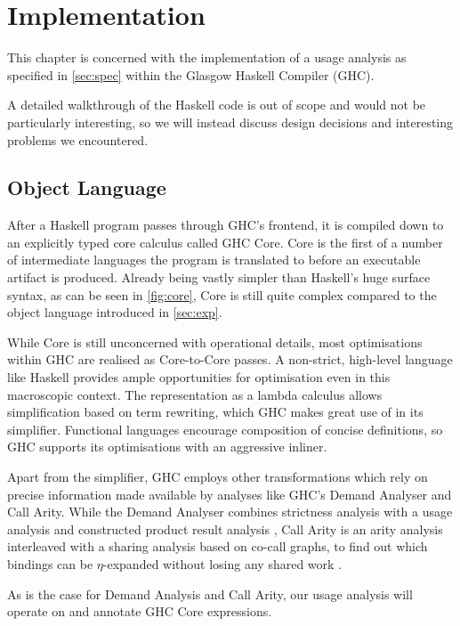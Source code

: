 \chapter{Implementation}\label{sec:impl}

This chapter is concerned with the implementation of a usage analysis as specified in \cref{sec:spec} within the Glasgow Haskell Compiler (GHC).

A detailed walkthrough of the Haskell code is out of scope and would not be particularly interesting, so we will instead discuss design decisions and interesting problems we encountered.

\section{Object Language}

After a Haskell program passes through GHC's frontend, it is compiled down to an explicitly typed core calculus called GHC Core. 
Core is the first of a number of intermediate languages the program is translated to before an executable artifact is produced.
Already being vastly simpler than Haskell's huge surface syntax, as can be seen in \cref{fig:core}, Core is still quite complex compared to the object language introduced in \cref{sec:exp}.

While Core is still unconcerned with operational details, most optimisations within GHC are realised as Core-to-Core passes.
A non-strict, high-level language like Haskell provides ample opportunities for optimisation even in this macroscopic context.
The representation as a lambda calculus allows simplification based on term rewriting, which GHC makes great use of in its simplifier.
Functional languages encourage composition of concise definitions, so GHC supports its optimisations with an aggressive inliner.

Apart from the simplifier, GHC employs other transformations which rely on precise information made available by analyses like GHC's Demand Analyser and Call Arity.
While the Demand Analyser combines strictness analysis \parencite{dmd} with a usage analysis \parencite{card} and constructed product result analysis \parencite{cpr}, Call Arity is an arity analysis interleaved with a sharing analysis based on co-call graphs, to find out which bindings can be $\eta$-expanded without losing any shared work .

As is the case for Demand Analysis and Call Arity, our usage analysis will operate on and annotate GHC Core expressions.

